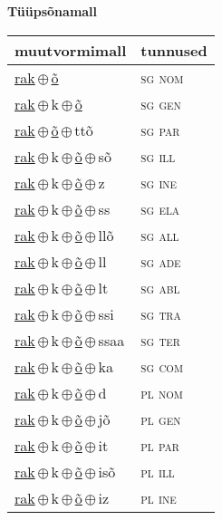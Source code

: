 

\vspace{3.5em}
\noindent \begin{minipage}{\textwidth}
\noindent \textbf{Tüüpsõnamall \,}\\

\begin{sideways}
\begin{tabular}{l l}
muutvormimall & tunnused \\
\hline
\underline{rak}\,$\oplus$\,\underline{õ} & \textsc{ sg nom } \\
\underline{rak}\,$\oplus$\,k\,$\oplus$\,\underline{õ} & \textsc{ sg gen } \\
\underline{rak}\,$\oplus$\,\underline{õ}\,$\oplus$\,ttõ & \textsc{ sg par } \\
\underline{rak}\,$\oplus$\,k\,$\oplus$\,\underline{õ}\,$\oplus$\,sõ & \textsc{ sg ill } \\
\underline{rak}\,$\oplus$\,k\,$\oplus$\,\underline{õ}\,$\oplus$\,z & \textsc{ sg ine } \\
\underline{rak}\,$\oplus$\,k\,$\oplus$\,\underline{õ}\,$\oplus$\,ss & \textsc{ sg ela } \\
\underline{rak}\,$\oplus$\,k\,$\oplus$\,\underline{õ}\,$\oplus$\,llõ & \textsc{ sg all } \\
\underline{rak}\,$\oplus$\,k\,$\oplus$\,\underline{õ}\,$\oplus$\,ll & \textsc{ sg ade } \\
\underline{rak}\,$\oplus$\,k\,$\oplus$\,\underline{õ}\,$\oplus$\,lt & \textsc{ sg abl } \\
\underline{rak}\,$\oplus$\,k\,$\oplus$\,\underline{õ}\,$\oplus$\,ssi & \textsc{ sg tra } \\
\underline{rak}\,$\oplus$\,k\,$\oplus$\,\underline{õ}\,$\oplus$\,ssaa & \textsc{ sg ter } \\
\underline{rak}\,$\oplus$\,k\,$\oplus$\,\underline{õ}\,$\oplus$\,ka & \textsc{ sg com } \\
\underline{rak}\,$\oplus$\,k\,$\oplus$\,\underline{õ}\,$\oplus$\,d & \textsc{ pl nom } \\
\underline{rak}\,$\oplus$\,k\,$\oplus$\,\underline{õ}\,$\oplus$\,jõ & \textsc{ pl gen } \\
\underline{rak}\,$\oplus$\,k\,$\oplus$\,\underline{õ}\,$\oplus$\,it & \textsc{ pl par } \\
\underline{rak}\,$\oplus$\,k\,$\oplus$\,\underline{õ}\,$\oplus$\,isõ & \textsc{ pl ill } \\
\underline{rak}\,$\oplus$\,k\,$\oplus$\,\underline{õ}\,$\oplus$\,iz & \textsc{ pl ine } \\

\end{tabular}
\end{sideways}
\end{minipage}

